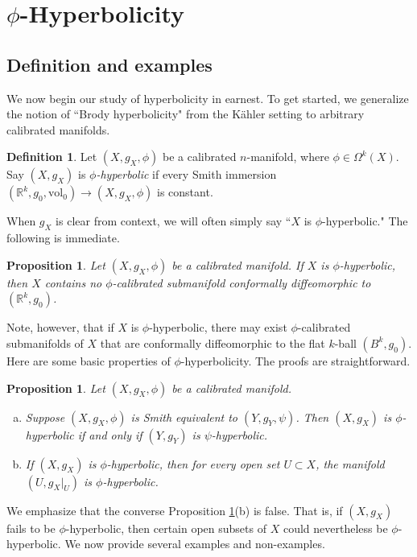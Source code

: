 \documentclass[11pt]{article}
\newcommand{\R}{\mathbb{R}}
\newcommand{\vol}{\mathrm{vol}}
\newtheorem{prop}[thm]{Proposition}
\theoremstyle{definition}
\newtheorem{defn}[thm]{Definition}
\numberwithin{equation}{section}
\begin{document}
\section{$\phi$-Hyperbolicity}

\subsection{Definition and examples}

\indent \indent We now begin our study of hyperbolicity in earnest.  To get started, we generalize the notion of ``Brody hyperbolicity" from the K\"{a}hler setting to arbitrary calibrated manifolds.

\begin{defn}  Let $(X, g_X, \phi)$ be a calibrated $n$-manifold, where $\phi \in \Omega^k(X)$.  Say $(X, g_X)$ is \emph{$\phi$-hyperbolic} if every Smith immersion $(\R^k, g_0, \vol_0) \to (X, g_X, \phi)$ is constant.
\end{defn}
\noindent  When $g_X$ is clear from context, we will often simply say ``$X$ is $\phi$-hyperbolic."  The following is immediate.

\begin{prop} Let $(X, g_X, \phi)$ be a calibrated manifold.  If $X$ is $\phi$-hyperbolic, then $X$ contains no $\phi$-calibrated submanifold conformally diffeomorphic to $(\R^k, g_0)$.
\end{prop}

\noindent Note, however, that if $X$ is $\phi$-hyperbolic, there may exist $\phi$-calibrated submanifolds of $X$ that are conformally diffeomorphic to the flat $k$-ball $(B^k, g_0)$. Here are some basic properties of $\phi$-hyperbolicity.  The proofs are straightforward.

\pagebreak

\begin{prop} \label{prop:Basic} Let $(X, g_X, \phi)$ be a calibrated manifold.
\begin{enumerate}[(a)]
\item Suppose $(X, g_X, \phi)$ is Smith equivalent to $(Y, g_Y, \psi)$.  Then $(X, g_X)$ is $\phi$-hyperbolic if and only if $(Y, g_Y)$ is $\psi$-hyperbolic.
\item If $(X, g_X)$ is $\phi$-hyperbolic, then for every open set $U \subset X$, the manifold $(U, g_X|_U)$ is $\phi$-hyperbolic.
\end{enumerate}
\end{prop}

\indent We emphasize that the converse Proposition \ref{prop:Basic}(b) is false.  That is, if $(X, g_X)$ fails to be $\phi$-hyperbolic, then certain open subsets of $X$ could nevertheless be $\phi$-hyperbolic.  We now provide several examples and non-examples.
\end{document}
